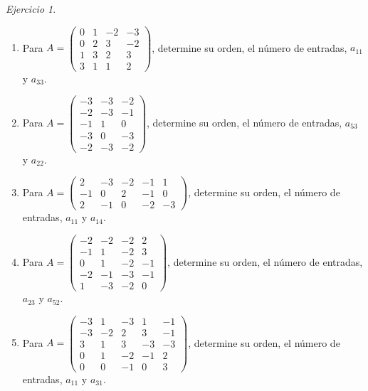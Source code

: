 \documentclass[12pt]{article}
\theoremstyle{remark}
\newtheorem{Ejer}[definicion]{Ejercicio}
\begin{document}
\begin{Ejer}
\begin{enumerate}[resume=banco]
\item Para $A=\begin{pmatrix}0&1&-2&-3\\0&2&3&-2\\1&3&2&3\\3&1&1&2\end{pmatrix}$, determine su orden, el número de entradas, $a_{11}$ y $a_{33}$.

\item Para $A=\begin{pmatrix}-3&-3&-2\\-2&-3&-1\\-1&1&0\\-3&0&-3\\-2&-3&-2\end{pmatrix}$, determine su orden, el número de entradas, $a_{53}$ y $a_{22}$.

\item Para $A=\begin{pmatrix}2&-3&-2&-1&1\\-1&0&2&-1&0\\2&-1&0&-2&-3\end{pmatrix}$, determine su orden, el número de entradas, $a_{11}$ y $a_{14}$.

\item Para $A=\begin{pmatrix}-2&-2&-2&2\\-1&1&-2&3\\0&1&-2&-1\\-2&-1&-3&-1\\1&-3&-2&0\end{pmatrix}$, determine su orden, el número de entradas, $a_{23}$ y $a_{52}$.

\item Para $A=\begin{pmatrix}-3&1&-3&1&-1\\-3&-2&2&3&-1\\3&1&3&-3&-3\\0&1&-2&-1&2\\0&0&-1&0&3\end{pmatrix}$, determine su orden, el número de entradas, $a_{11}$ y $a_{31}$.

\end{enumerate}
\end{Ejer}
\end{document}
